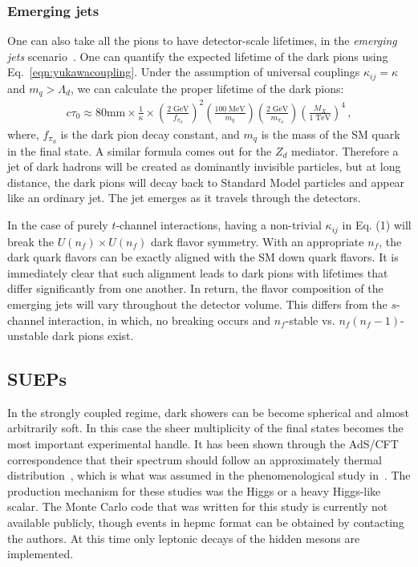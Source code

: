 \subsubsection{Emerging jets}
One can also take all the pions to have detector-scale lifetimes, in the {\em emerging jets} scenario~\cite{Schwaller:2015gea}. One can quantify the expected lifetime of the dark pions using Eq.~\ref{eqn:yukawacoupling}.  Under the assumption of universal couplings
$\kappa_{ij} = \kappa$ and $m_{q} > \Lambda_{d}$, we can calculate the proper lifetime of the dark pions:
%
\begin{align}
	c \tau_{0} \approx 80 \mathrm{mm} \times \frac{1}{\kappa} \times \left( \frac{2 \;\mathrm{GeV}}{f_{\pi_{d}}} \right)^2 \left( \frac{100 \;\mathrm{MeV}}{m_{q}} \right) \left( \frac{2\; \mathrm{GeV}}{m_{\pi_{d} }} \right) \left( \frac{M_{X}}{1 \;\mathrm{TeV}} \right)^4 \,,
\end{align}
where, $f_{\pi_{d}}$ is the dark pion decay constant, and $m_q$ is the mass of the SM quark in the final state.  A similar formula comes out for the $Z_d$ mediator. Therefore a jet of dark hadrons will be created as dominantly invisible particles, but at long distance, the dark pions will decay back to Standard Model particles and appear like an ordinary jet. The jet emerges as it travels through the detectors.


In the case of purely $t$-channel interactions, having a non-trivial $\kappa_{ij}$ in Eq. (1) will break the $U(n_{f}) \times U(n_{f})$ dark flavor symmetry. With an appropriate $n_{f}$, the dark quark flavors can be exactly aligned with the SM down quark flavors. It is immediately clear that such alignment leads to dark pions with lifetimes that differ significantly
from one another. In return, the flavor composition of the emerging jets will vary throughout the detector volume. This differs from the $s$-channel interaction, in which, no breaking occurs and $n_{f}$-stable vs. $n_{f}(n_{f} - 1)$-unstable dark pions exist.

\subsection{SUEPs}
In the strongly coupled regime, dark showers can be become spherical and almost arbitrarily soft. In this case the sheer multiplicity of the final states becomes the most important experimental handle. It has been shown through the AdS/CFT correspondence that their spectrum should follow an approximately thermal distribution~\cite{Hatta:2008qx}, which is what was assumed in the phenomenological study in~\cite{Knapen:2016hky}. The production mechanism for these studies was the Higgs or a heavy Higgs-like scalar. The Monte Carlo code that was written for this study is currently not available publicly, though events in hepmc format can be obtained by contacting the authors. At this time only leptonic decays of the hidden mesons are implemented.




